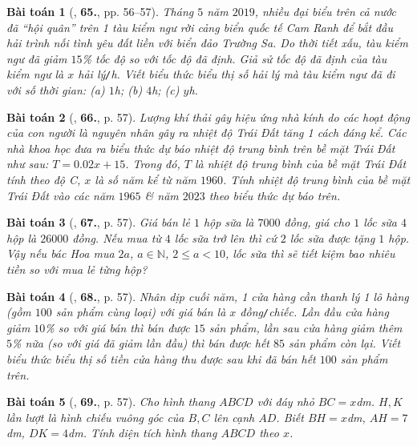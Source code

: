 \documentclass{article}
\numberwithin{equation}{section}
\newtheorem{baitoan}{Bài toán}
\begin{document}
\begin{baitoan}[\cite{SBT_Toan_7_Canh_Dieu_tap_2}, \textbf{65.}, pp. 56--57]
	Tháng $5$ năm $2019$, nhiều đại biểu trên cả nước đã ``hội quân'' trên 1 tàu kiểm ngư rời cảng biển quốc tế Cam Ranh để bắt đầu hải  trình nối tình yêu đất liền với biển đảo Trường Sa. Do thời tiết xấu, tàu kiểm ngư đã giảm $15$\% tốc độ so với tốc độ đã định. Giả sử tốc độ đã định của tàu kiểm ngư là $x$ \emph{hải lý\texttt{/}h}. Viết biểu thức biểu thị số hải lý mà tàu kiểm ngư đã đi với số thời gian: (a) $1$\emph{h}; (b) $4$\emph{h}; (c) $y$\emph{h}.
\end{baitoan}

\begin{baitoan}[\cite{SBT_Toan_7_Canh_Dieu_tap_2}, \textbf{66.}, p. 57]
	Lượng khí thải gây hiệu ứng nhà kính do các hoạt động của con người là nguyên nhân gây ra nhiệt độ Trái Đất tăng 1 cách đáng kể. Các nhà khoa học đưa ra biểu thức dự báo nhiệt độ trung bình trên bề mặt Trái Đất như sau: $T = 0.02x + 15$. Trong đó, $T$ là nhiệt độ trung bình của bề mặt Trái Đất tính theo độ \emph{C}, $x$ là số năm kể từ năm $1960$. Tính nhiệt độ trung bình của bề mặt Trái Đất vào các năm $1965$ \& năm $2023$ theo biểu thức dự báo trên.
\end{baitoan}

\begin{baitoan}[\cite{SBT_Toan_7_Canh_Dieu_tap_2}, \textbf{67.}, p. 57]
	Giá bán lẻ $1$ hộp sữa là $7000$ đồng, giá cho $1$ lốc sữa $4$ hộp là $26000$ đồng. Nếu mua từ $4$ lốc sữa trở lên thì cứ $2$ lốc sữa được tặng $1$ hộp. Vậy nếu bác Hoa mua $2a$, $a\in\mathbb{N}$, $2\le a < 10$, lốc sữa thì sẽ tiết kiệm bao nhiêu tiền so với mua lẻ từng hộp?
\end{baitoan}

\begin{baitoan}[\cite{SBT_Toan_7_Canh_Dieu_tap_2}, \textbf{68.}, p. 57]
	Nhân dịp cuối năm, 1 cửa hàng cần thanh lý 1 lô hàng (gồm $100$ sản phẩm cùng loại) với giá bán là $x$ \emph{đồng\texttt{/}chiếc}. Lần đầu cửa hàng giảm $10$\% so với giá bán thì bán được $15$ sản phẩm, lần sau cửa hàng giảm thêm $5$\% nữa (so với giá đã giảm lần đầu) thì bán được hết $85$ sản phẩm còn lại. Viết biểu thức biểu thị số tiền cửa hàng thu được sau khi đã bán hết $100$ sản phẩm trên.
\end{baitoan}

\begin{baitoan}[\cite{SBT_Toan_7_Canh_Dieu_tap_2}, \textbf{69.}, p. 57]
	Cho hình thang $ABCD$ với đáy nhỏ $BC = x$\emph{dm}. $H,K$ lần lượt là hình chiếu vuông góc của $B,C$ lên cạnh $AD$. Biết $BH = x$\emph{dm}, $AH = 7$\emph{dm}, $DK = 4$\emph{dm}. Tính diện tích hình thang $ABCD$ theo $x$.
\end{baitoan}
\end{document}
